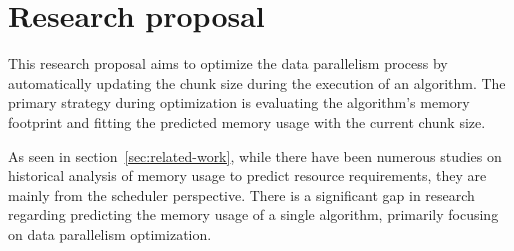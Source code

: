 \section{Research proposal}
\label{sec:research-proposal}

This research proposal aims to optimize the data parallelism process by automatically updating the chunk size during the execution of an algorithm.
The primary strategy during optimization is evaluating the algorithm's memory footprint and fitting the predicted memory usage with the current chunk size.

As seen in section~\ref{sec:related-work}, while there have been numerous studies on historical analysis of memory usage to predict resource requirements, they are mainly from the scheduler perspective.
There is a significant gap in research regarding predicting the memory usage of a single algorithm, primarily focusing on data parallelism optimization.







